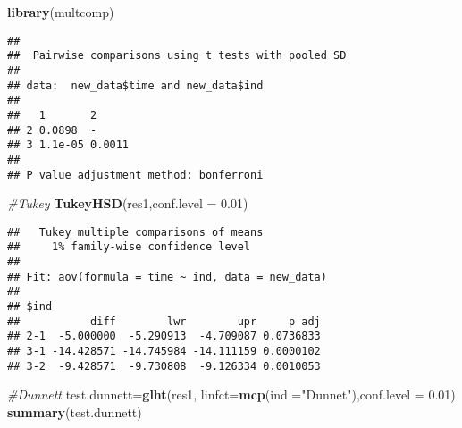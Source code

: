 \documentclass[]{article}
\newenvironment{Shaded}{\begin{snugshade}}{\end{snugshade}}
\newcommand{\KeywordTok}[1]{\textcolor[rgb]{0.13,0.29,0.53}{\textbf{#1}}}
\newcommand{\DataTypeTok}[1]{\textcolor[rgb]{0.13,0.29,0.53}{#1}}
\newcommand{\FloatTok}[1]{\textcolor[rgb]{0.00,0.00,0.81}{#1}}
\newcommand{\StringTok}[1]{\textcolor[rgb]{0.31,0.60,0.02}{#1}}
\newcommand{\CommentTok}[1]{\textcolor[rgb]{0.56,0.35,0.01}{\textit{#1}}}
\newcommand{\OperatorTok}[1]{\textcolor[rgb]{0.81,0.36,0.00}{\textbf{#1}}}
\newcommand{\NormalTok}[1]{#1}
\begin{document}
\begin{Shaded}
\begin{Highlighting}[]
\KeywordTok{library}\NormalTok{(multcomp)}
\end{Highlighting}
\end{Shaded}

\begin{Shaded}
\end{Shaded}

\begin{verbatim}
## 
##  Pairwise comparisons using t tests with pooled SD 
## 
## data:  new_data$time and new_data$ind 
## 
##   1       2     
## 2 0.0898  -     
## 3 1.1e-05 0.0011
## 
## P value adjustment method: bonferroni
\end{verbatim}

\begin{Shaded}
\begin{Highlighting}[]
\CommentTok{#Tukey}
\KeywordTok{TukeyHSD}\NormalTok{(res1,}\DataTypeTok{conf.level =} \FloatTok{0.01}\NormalTok{)}
\end{Highlighting}
\end{Shaded}

\begin{verbatim}
##   Tukey multiple comparisons of means
##     1% family-wise confidence level
## 
## Fit: aov(formula = time ~ ind, data = new_data)
## 
## $ind
##           diff        lwr        upr     p adj
## 2-1  -5.000000  -5.290913  -4.709087 0.0736833
## 3-1 -14.428571 -14.745984 -14.111159 0.0000102
## 3-2  -9.428571  -9.730808  -9.126334 0.0010053
\end{verbatim}

\begin{Shaded}
\begin{Highlighting}[]
\CommentTok{#Dunnett}
\NormalTok{test.dunnett=}\KeywordTok{glht}\NormalTok{(res1, }\DataTypeTok{linfct=}\KeywordTok{mcp}\NormalTok{(}\DataTypeTok{ind =}\StringTok{"Dunnet"}\NormalTok{),}\DataTypeTok{conf.level =} \FloatTok{0.01}\NormalTok{) }
\KeywordTok{summary}\NormalTok{(test.dunnett)}
\end{Highlighting}
\end{Shaded}
\end{document}
